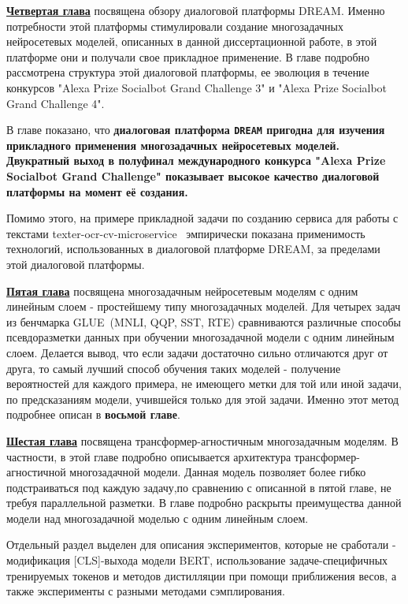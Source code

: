 \underline{\textbf{Четвертая глава}} посвящена обзору диалоговой платформы DREAM. Именно потребности этой платформы стимулировали создание многозадачных нейросетевых моделей, описанных в данной диссертационной работе, в этой платформе они и получали свое прикладное применение. В главе подробно рассмотрена структура этой диалоговой платформы, ее эволюция в течение конкурсов "Alexa Prize Socialbot Grand Challenge 3" и "Alexa Prize Socialbot Grand Challenge 4".

В главе показано, что  \textbf{диалоговая платформа \texttt{DREAM} пригодна для изучения прикладного применения многозадачных нейросетевых моделей. Двукратный выход в полуфинал международного конкурса "Alexa Prize Socialbot Grand Challenge" показывает высокое качество диалоговой платформы на момент её создания.}

Помимо этого, на примере прикладной задачи по созданию сервиса для работы с текстами texter-ocr-cv-microservice~\cite{Дуплякин_Дмитрий_Ондар_Ушаков_2021} эмпирически показана применимость технологий, использованных в диалоговой платформе DREAM, за пределами этой диалоговой платформы. 


\underline{\textbf{Пятая глава}} посвящена многозадачным нейросетевым моделям с одним линейным слоем - простейшему типу многозадачных моделей. Для четырех задач из бенчмарка GLUE~\cite{wang_2018}(MNLI, QQP, SST, RTE) сравниваются различные способы псевдоразметки данных при обучении многозадачной модели с одним линейным слоем. Делается вывод, что если задачи достаточно сильно отличаются друг от друга, то самый лучший способ обучения таких моделей - получение вероятностей для каждого примера, не имеющего метки для той или иной задачи, по предсказаниям модели, учившейся только для этой задачи. Именно этот метод подробнее описан в \textbf{восьмой главе}.

\underline{\textbf{Шестая глава}} посвящена трансформер-агностичным многозадачным моделям. В частности, в этой главе подробно описывается архитектура трансформер-агностичной многозадачной модели. Данная модель позволяет более гибко подстраиваться под каждую задачу,по сравнению с описанной в пятой главе, не требуя параллельной разметки. В главе подробно раскрыты преимущества данной модели над многозадачной моделью с одним линейным слоем.

Отдельный раздел выделен для описания экспериментов, которые не сработали - модификация [CLS]-выхода модели BERT, использование задаче-специфичных тренируемых токенов и методов дистилляции при помощи приближения весов, а также эксперименты с разными методами сэмплирования. 


